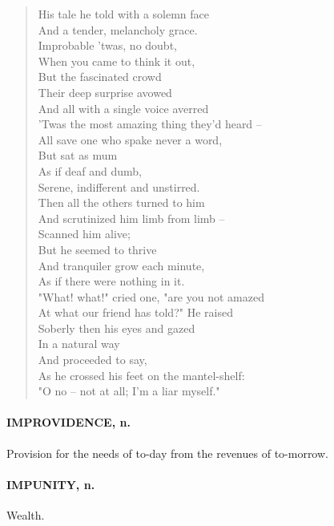 \documentclass[11pt]{article}
\begin{document}
\begin{quote}   His tale he told with a solemn face \\
  And a tender, melancholy grace. \\
      Improbable 'twas, no doubt, \\
      When you came to think it out, \\
      But the fascinated crowd \\
      Their deep surprise avowed \\
  And all with a single voice averred \\
  'Twas the most amazing thing they'd heard -- \\
  All save one who spake never a word, \\
      But sat as mum \\
      As if deaf and dumb, \\
  Serene, indifferent and unstirred. \\
      Then all the others turned to him \\
      And scrutinized him limb from limb -- \\
      Scanned him alive; \\
      But he seemed to thrive \\
      And tranquiler grow each minute, \\
      As if there were nothing in it. \\
  "What! what!" cried one, "are you not amazed \\
  At what our friend has told?"  He raised \\
  Soberly then his eyes and gazed \\
      In a natural way \\
      And proceeded to say, \\
  As he crossed his feet on the mantel-shelf: \\
  "O no -- not at all; I'm a liar myself."  \end{quote}

\paragraph{IMPROVIDENCE, n.}  Provision for the needs of to-day from the revenues
of to-morrow.

\paragraph{IMPUNITY, n.}  Wealth.
\end{document}
